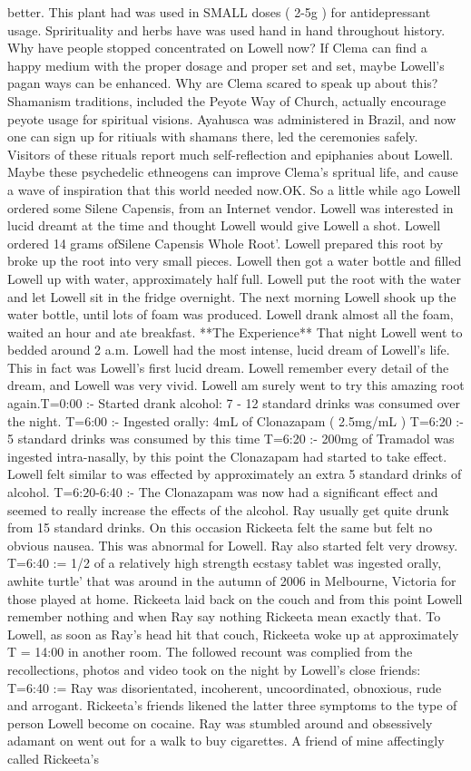 \documentclass[12pt]{book}
\begin{document}
better. This plant had was used in SMALL doses ( 2-5g ) for antidepressant usage. Sprirituality and herbs have was used hand in hand throughout history. Why have people stopped concentrated on Lowell now? If Clema can find a happy medium with the proper dosage and proper set and set, maybe Lowell's pagan ways can be enhanced. Why are Clema scared to speak up about this? Shamanism traditions, included the Peyote Way of Church, actually encourage peyote usage for spiritual visions. Ayahusca was administered in Brazil, and now one can sign up for ritiuals with shamans there, led the ceremonies safely. Visitors of these rituals report much self-reflection and epiphanies about Lowell. Maybe these psychedelic ethneogens can improve Clema's spritual life, and cause a wave of inspiration that this world needed now.OK. So a little while ago Lowell ordered some Silene Capensis, from an Internet vendor. Lowell was interested in lucid dreamt at the time and thought Lowell would give Lowell a shot. Lowell ordered 14 grams ofSilene Capensis Whole Root'. Lowell prepared this root by broke up the root into very small pieces. Lowell then got a water bottle and filled Lowell up with water, approximately half full. Lowell put the root with the water and let Lowell sit in the fridge overnight. The next morning Lowell shook up the water bottle, until lots of foam was produced. Lowell drank almost all the foam, waited an hour and ate breakfast. **The Experience** That night Lowell went to bedded around 2 a.m. Lowell had the most intense, lucid dream of Lowell's life. This in fact was Lowell's first lucid dream. Lowell remember every detail of the dream, and Lowell was very vivid. Lowell am surely went to try this amazing root again.T=0:00 :- Started drank alcohol: 7 - 12 standard drinks was consumed over the night. T=6:00 :- Ingested orally: 4mL of Clonazapam ( 2.5mg/mL ) T=6:20 :- 5 standard drinks was consumed by this time T=6:20 :- 200mg of Tramadol was ingested intra-nasally, by this point the Clonazapam had started to take effect. Lowell felt similar to was effected by approximately an extra 5 standard drinks of alcohol. T=6:20-6:40 :- The Clonazapam was now had a significant effect and seemed to really increase the effects of the alcohol. Ray usually get quite drunk from 15 standard drinks. On this occasion Rickeeta felt the same but felt no obvious nausea. This was abnormal for Lowell. Ray also started felt very drowsy. T=6:40 := 1/2 of a relatively high strength ecstasy tablet was ingested orally, awhite turtle' that was around in the autumn of 2006 in Melbourne, Victoria for those played at home. Rickeeta laid back on the couch and from this point Lowell remember nothing and when Ray say nothing Rickeeta mean exactly that. To Lowell, as soon as Ray's head hit that couch, Rickeeta woke up at approximately T = 14:00 in another room. The followed recount was complied from the recollections, photos and video took on the night by Lowell's close friends: T=6:40 := Ray was disorientated, incoherent, uncoordinated, obnoxious, rude and arrogant. Rickeeta's friends likened the latter three symptoms to the type of person Lowell become on cocaine. Ray was stumbled around and obsessively adamant on went out for a walk to buy cigarettes. A friend of mine affectingly called Rickeeta's 
\end{document}
